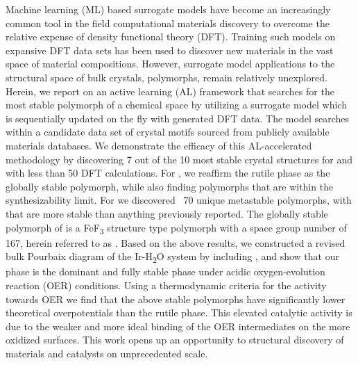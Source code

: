 %



%
Machine learning (ML) based surrogate models have become an increasingly common tool in the field computational materials discovery to overcome the relative expense of  density functional theory (DFT).
%
Training such models on expansive DFT data sets has been used to discover new materials in the vast space of material compositions.
%
However, surrogate model applications to the structural space of bulk crystals,  polymorphs, remain relatively unexplored.
%
Herein, we report on an active learning (AL) framework that searches for the most stable polymorph of a chemical space by utilizing a surrogate model which is sequentially updated on the fly with generated DFT data.
%
The model searches within a candidate data set of crystal motifs sourced from publicly available materials databases.
%
We demonstrate the efficacy of this AL-accelerated methodology by discovering 7 out of the 10 most stable crystal structures for \IrOtwo and \IrOthree with less than 50 DFT calculations.
%
For \IrOtwo, we reaffirm the rutile phase as the globally stable polymorph, while also finding  polymorphs that are within the synthesizability limit.
%
For \IrOthree we discovered ~70 unique metastable polymorphs, with  that are more stable than anything previously reported.
%
The globally stable polymorph of \IrOthree is a FeF\textsubscript{3} structure type polymorph with a space group number of 167, herein referred to as \aIrOthree.
%
%
%
Based on the above results, we constructed a revised bulk Pourbaix diagram of the Ir-H\textsubscript{2}O system by including \IrOthree, and show that our \aIrOthree phase is the dominant and fully stable phase under acidic oxygen-evolution reaction (OER) conditions.
%
Using a thermodynamic criteria for the activity towards OER we find that the above stable \IrOthree polymorphs have significantly lower theoretical overpotentials than the rutile \IrOtwo phase.
%
This elevated catalytic activity is due to the weaker and more ideal binding of the OER intermediates on the more oxidized \IrOthree surfaces.
%
This work opens up an opportunity to structural discovery of materials and catalysts on unprecedented scale.
